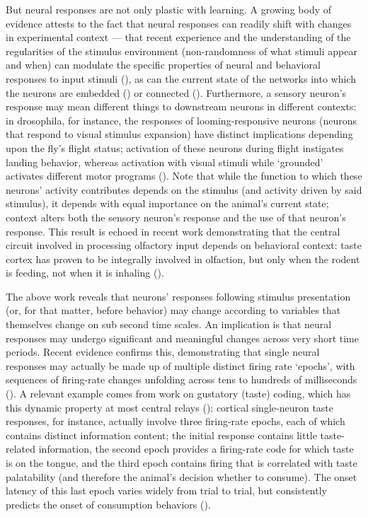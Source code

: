\begin{refsection}
But neural responses are not only plastic with learning. A growing body of evidence attests to the fact that neural responses can readily shift with changes in experimental context — that recent experience and the understanding of the regularities of the stimulus environment (non-randomness of what stimuli appear and when) can modulate the specific properties of neural and behavioral responses to input stimuli (\cite{flores2018a,noudoost2017a}), as can the current state of the networks into which the neurons are embedded (\cite{sakata2016a}) or connected (\cite{mante2013a,safaai2015a}). Furthermore, a sensory neuron’s response may mean different things to downstream neurons in different contexts: in drosophila, for instance, the responses of looming-responsive neurons (neurons that respond to visual stimulus expansion) have distinct implications depending upon the fly’s flight status; activation of these neurons during flight instigates landing behavior, whereas activation with visual stimuli while ‘grounded’ activates different motor programs (\cite{ache2019a}). Note that while the function to which these neurons’ activity contributes depends on the stimulus (and activity driven by said stimulus), it depends with equal importance on the animal’s current state; context alters both the sensory neuron’s response and the use of that neuron’s response. This result is echoed in recent work demonstrating that the central circuit involved in processing olfactory input depends on behavioral context: taste cortex has proven to be integrally involved in olfaction, but only when the rodent is feeding, not when it is inhaling (\cite{blankenship2019a}).

The above work reveals that neurons’ responses following stimulus presentation (or, for that matter, before behavior) may change according to variables that themselves change on sub second time scales. An implication is that neural responses may undergo significant and meaningful changes across very short time periods. Recent evidence confirms this, demonstrating that single neural responses may actually be made up of multiple distinct firing rate ‘epochs’, with sequences of firing-rate changes unfolding across tens to hundreds of milliseconds (\cite{guo2015a,sauerbrei2020a,sugase1999a}). A relevant example comes from work on gustatory (taste) coding, which has this dynamic property at most central relays (\cite{baez-santiago2016a,fontanini2008a,li2016a,li2013a}): cortical single-neuron taste responses, for instance, actually involve three firing-rate epochs, each of which contains distinct information content; the initial response contains little taste-related information, the second epoch provides a firing-rate code for which taste is on the tongue, and the third epoch contains firing that is correlated with taste palatability (and therefore the animal’s decision whether to consume). The onset latency of this last epoch varies widely from trial to trial, but consistently predicts the onset of consumption behaviors (\cite{sadacca2012a}).


\end{refsection}

